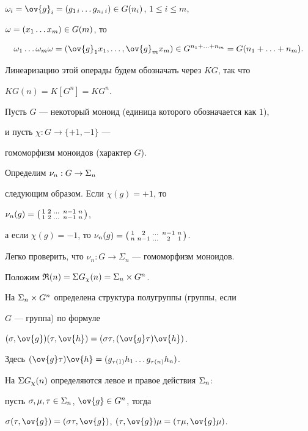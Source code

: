 $\o_i=\ov{g}_i=(g_{1\,i} \dotsc g_{n_i\,i})\in G(n_i)$, $1\le i \le m$,


$\omega=(x_1\dotsc x_m)\in G(m)$, то


$$


\o_1\dotsc \o_m\o=(\ov{g}_1 x_1,\dotsc,\ov{g}_m x_m)\in G^{n_1+\dotsc +n_m}=


G(n_1+\dotsc +n_m).


$$


Линеаризацию этой операды будем обозначать через $KG$, так что


$KG(n)=K[G^n]=KG^n$.








Пусть $G$ --- некоторый моноид (единица которого обозначается как $1$),


и пусть $\chi:G\rightarrow \{+1,-1\}$ ---


гомоморфизм моноидов (характер $G$).


Определим $\nu_n:G \to \Sigma_n$


следующим образом. Если $\chi(g)=+1$, то


$\nu_n(g)=


\mymat{1 & 2 & \dotsc & n-1 & n \\


1 & 2 & \dotsc & n-1 & n}$,


а если $\chi(g)=-1$, то $\nu_n(g)=


\mymat{1 & 2 & \dotsc & n-1 & n \\


n & n-1 & \dotsc & 2 & 1}$.


Легко проверить, что $\nu_n: G\rightarrow \Sigma_n$ --- гомоморфизм моноидов.





Положим ${\frak R}(n)=\Sigma G_{\chi}(n)=\Sigma_n \times G^n$.


На $\Sigma_n \times G^n$ определена структура полугруппы (группы, если


$G$ --- группа) по формуле


$(\s,\ov{g})(\t,\ov{h})=(\s\t, (\ov{g}\t)\ov{h})$.


Здесь $(\ov{g}\t)\ov{h}=(g_{\t (1)}h_1 \dotsc g_{\t(n)}h_n)$.


На $\Sigma G_{\chi}(n)$ определяются левое и правое действия $\Sigma_n$:


пусть $\sigma,\mu,\tau\in\Sigma_n$, $\ov{g}\in G^n$, тогда


$ \s (\t,\ov{g})=(\s\t,\ov{g})$, $(\t,\ov{g})\mu=(\t\mu,\ov{g}\mu)$.


